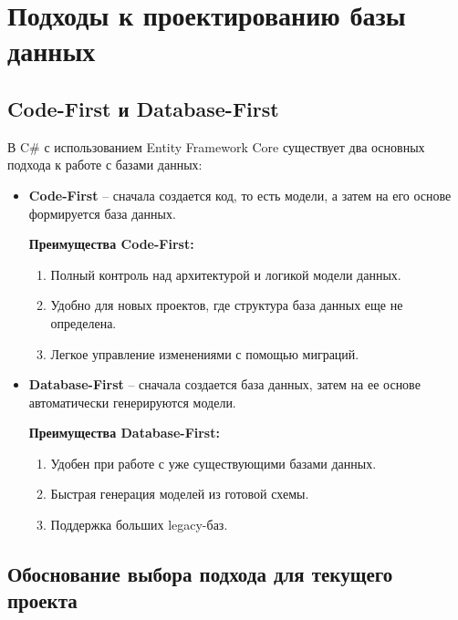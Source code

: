 \documentclass[a4paper,12pt]{report}
\begin{document}
\section{Подходы к проектированию базы данных}

\subsection{Code-First и Database-First}

В C\# с использованием Entity Framework Core существует два основных подхода к работе с базами данных:
\begin{itemize}
    \item
        \textbf{Code-First} -- сначала создается код, то есть модели, а затем на его основе формируется база данных.

        \textbf{Преимущества Code-First:}
        \begin{enumerate}
                    \item
                        Полный контроль над архитектурой и логикой модели данных.
                    \item
                        Удобно для новых проектов, где структура база данных еще не определена.
                    \item
                        Легкое управление изменениями с помощью миграций.
        \end{enumerate}
    \item
        \textbf{Database-First} -- сначала создается база данных, затем на ее основе автоматически генерируются модели.

        \textbf{Преимущества Database-First:}
        \begin{enumerate}
                    \item
                        Удобен при работе с уже существующими базами данных.
                    \item
                        Быстрая генерация моделей из готовой схемы.
                    \item
                        Поддержка больших legacy-баз.
        \end{enumerate}
\end{itemize}

\subsection{Обоснование выбора подхода для текущего проекта}
\end{document}
